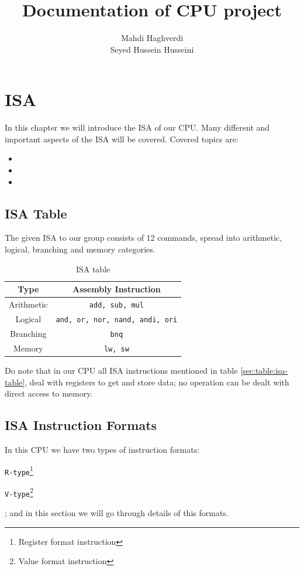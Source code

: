 \documentclass[12pt, dvipsnames, svgnames, x11names, oneside]{book}
\title{Documentation of CPU project}
\author{
Mahdi Haghverdi \\
Seyed Hussein Husseini \\
}
\newenvironment{sansserif}{\sffamily}{\normalfont}
\begin{document}
\maketitle
\frontmatter
\tableofcontents
\mainmatter

\chapter{ISA}\label{ch:isa}
\begin{sansserif}
In this chapter we will introduce the ISA of our CPU. Many different and important aspects of the ISA will be covered. Covered topics are:
\begin{itemize}
\item {}
\item {}
\item {}
\end{itemize}
\end{sansserif}

\section{ISA Table}\label{sec:isa-table}
The given ISA to our group consists of 12 commands, spread into arithmetic, logical, branching and memory categories.

\begin{table}[hb]
\caption{ISA table}
\begin{center}
\begin{tabular}{|c|c|}
\hline
Type & Assembly Instruction \\
\hline
\hline
Arithmetic & \texttt{add, sub, mul} \\
\hline
Logical & \texttt{and, or, nor, nand, andi, ori} \\
\hline
Branching & \texttt{bnq} \\
\hline
Memory & \texttt{lw, sw} \\
\hline
\end{tabular}
\end{center}
\end{table}\label{sec:table:isa-table}

Do note that in our CPU all ISA instructions mentioned in table \ref{sec:table:isa-table}, deal with registers to get and store data; no operation can be dealt with direct access to memory.

\section{ISA Instruction Formats}\label{sec:isa-insts}
In this CPU we have two types of instruction formats: 
\begin{enumerate*}
\item \texttt{R-type}\footnote{Register format instruction}
\item \texttt{V-type}\footnote{Value format instruction}
\end{enumerate*}; and in this section we will go through details of this formats. \\
\end{document}
